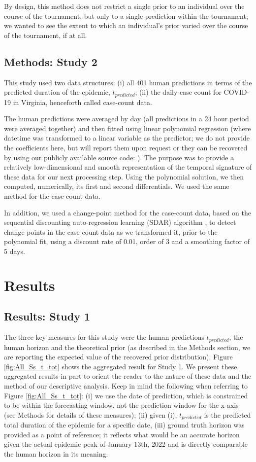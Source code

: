 \documentclass[a4paper,man,natbib]{apa6}
\begin{document}
By design, this method does not restrict a single prior to an individual over the course of the tournament, but only to a single prediction within the tournament; we wanted to see the extent to which an individual's prior varied over the course of the tournament, if at all.  

\subsection{Methods: Study 2}
This study used two data structures: (i) all 401 human predictions in terms of the predicted duration of the epidemic, $t_{predicted}$; (ii) the daily-case count for COVID-19 in Virginia, henceforth called case-count data.  

The human predictions were averaged by day (all predictions in a 24 hour period were averaged together) and then fitted using linear polynomial regression (where datetime was transformed to a linear variable as the predictor; we do not provide the coefficients here, but will report them upon request or they can be recovered by using our publicly available source code: \cite{orrgit}).  The purpose was to provide a relatively low-dimensional and smooth representation of the temporal signature of these data for our next processing step. Using the polynomial solution, we then computed, numerically, its first and second differentials.  We used the same method for the case-count data. 

In addition, we used a change-point method for the case-count data, based on the sequential discounting auto-regression learning (SDAR) algorithm \citep{Yamanishi2002}, to detect change points in the case-count data as we transformed it, prior to the polynomial fit, using a discount rate of 0.01, order of 3 and a smoothing factor of 5 days. 

\section{Results}\label{results}
\subsection{Results: Study 1}
The three key measures for this study were the human predictions $t_{predicted}$, the human horizon and the theoretical prior (as described in the Methods section, we are reporting the expected value of the recovered prior distribution).  Figure \ref{fig:All_Ss_t_tot} shows the aggregated result for Study 1.  We present these aggregated results in part to orient the reader to the nature of these data and the method of our descriptive analysis.  Keep in mind the following when referring to Figure \ref{fig:All_Ss_t_tot}:  (i) we use the date of prediction, which is constrained to be within the forecasting window, not the prediction window for the x-axis (see Methods for details of these measures); (ii) given (i), $t_{predicted}$ is the predicted total duration of the epidemic for a specific date, (iii) ground truth horizon was provided as a point of reference; it reflects what would be an accurate horizon given the actual epidemic peak of January 13th, 2022 and is directly comparable the human horizon in its meaning.  
\end{document}
